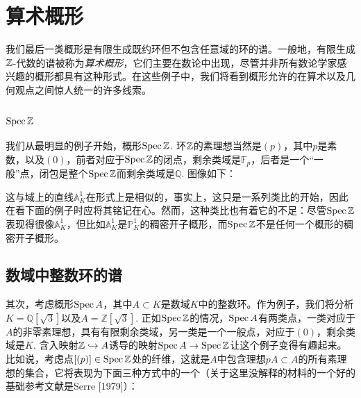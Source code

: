 \section{算术概形} \label{s:2.4}

我们最后一类概形是有限生成既约环但不包含任意域的环的谱。一般地，有限生成$\mathbb{Z}$\hyp 代数的谱被称为\textit{算术概形}，它们主要在数论中出现，尽管并非所有数论学家感兴趣的概形都具有这种形式。在这些例子中，我们将看到概形允许的在算术以及几何观点之间惊人统一的许多线索。

\subsection{\texorpdfstring{$\operatorname{Spec} \mathbb{Z}$}{Spec Z}} \label{s:2.4.1}

我们从最明显的例子开始，概形$\operatorname{Spec} \mathbb{Z}$. 环$\mathbb{Z}$的素理想当然是$(p)$，其中$p$是素数，以及$(0)$，前者对应于$\operatorname{Spec} \mathbb{Z}$的闭点，剩余类域是$\mathbb{F}_p$，后者是一个“一般”点，闭包是整个$\operatorname{Spec} \mathbb{Z}$而剩余类域是$\mathbb{Q}$. 图像如下：


\noindent 这与域上的直线$\mathbb{A}_K^1$在形式上是相似的，事实上，这只是一系列类比的开始，因此在看下面的例子时应将其铭记在心。然而，这种类比也有着它的不足：尽管$\operatorname{Spec} \mathbb{Z}$表现得很像$\mathbb{A}_K^1$，但比如$\mathbb{A}_K^1$是$\mathbb{P}_K^1$的稠密开子概形，而$\operatorname{Spec} \mathbb{Z}$不是任何一个概形的稠密开子概形。

\subsection{数域中整数环的谱} \label{s:2.4.2}

其次，考虑概形$\operatorname{Spec} A$，其中$A\subset K$是数域$K$中的整数环。作为例子，我们将分析$K=\mathbb{Q}[\sqrt{3}]$以及$A=\mathbb{Z}[\sqrt{3}]$. 正如$\operatorname{Spec} \mathbb{Z}$的情况，$\operatorname{Spec} A$有两类点，一类对应于$A$的非零素理想，具有有限剩余类域，另一类是一个一般点，对应于$(0)$，剩余类域是$K$. 含入映射$\mathbb{Z}\hookrightarrow A$诱导的映射$\operatorname{Spec} A\to \operatorname{Spec} \mathbb{Z}$让这个例子变得有趣起来。比如说，考虑点$[(p)]\in \operatorname{Spec} \mathbb{Z}$处的纤维，这就是$A$中包含理想$pA\subset A$的所有素理想的集合，它将表现为下面三种方式中的一个（关于这里没解释的材料的一个好的基础参考文献是Serre [1979]）：

